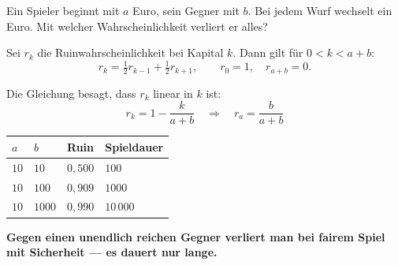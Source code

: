 \begin{aufgabe}
Ein Spieler beginnt mit $a$ Euro, sein Gegner mit $b$. Bei jedem Wurf wechselt ein Euro. Mit welcher Wahrscheinlichkeit verliert er alles?

\loesung
{}
Sei $r_k$ die Ruinwahrscheinlichkeit bei Kapital $k$. Dann gilt für $0 < k < a+b$:
\[ r_k = \tfrac12 r_{k-1} + \tfrac12 r_{k+1}, \qquad r_0 = 1,\quad r_{a+b} = 0 . \]

Die Gleichung besagt, dass $r_k$ linear in $k$ ist:
\[ r_k = 1 - \frac{k}{a+b} \quad\Longrightarrow\quad r_a = \frac{b}{a+b} \]

\begin{center}
{\small
\renewcommand{\arraystretch}{1.46}
\begin{tabular}{@{}P{1.6cm}P{1.6cm}P{2.2cm}P{2.4cm}@{}}
\toprule
$a$ & $b$ & \textbf{Ruin} & \textbf{Spieldauer}\\
\midrule
$10$ & $10$ & $0{,}500$ & $100$\\
$10$ & $100$ & $0{,}909$ & $1000$\\
$10$ & $1000$ & $0{,}990$ & $10\,000$\\
\bottomrule
\end{tabular}}
\end{center}

\begin{center}
\begin{minipage}{0.9\textwidth}
\textbf{Gegen einen unendlich reichen Gegner verliert man bei fairem Spiel mit Sicherheit --- es dauert nur lange.}
\end{minipage}
\end{center}

\begin{center}
\begin{minipage}{0.88\textwidth}
\end{minipage}
\end{center}
\end{aufgabe}


